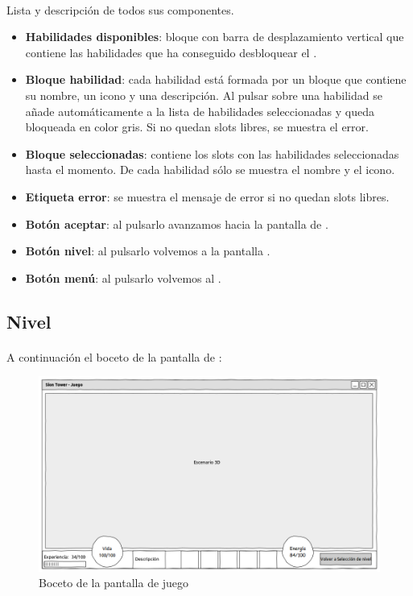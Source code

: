 \paragraph{}
Lista y descripción de todos sus componentes.

\begin{itemize}
    \item \textbf{Habilidades disponibles}: bloque con barra de desplazamiento
    vertical que contiene las habilidades que ha conseguido desbloquear el
    \jugador.
    \item \textbf{Bloque habilidad}: cada habilidad está formada por un bloque
    que contiene su nombre, un icono y una descripción. Al pulsar sobre una habilidad
    se añade automáticamente a la lista de habilidades seleccionadas y queda
    bloqueada en color gris. Si no quedan slots libres, se muestra el error.
    \item \textbf{Bloque seleccionadas}: contiene los slots con las habilidades
    seleccionadas hasta el momento. De cada habilidad sólo se muestra el nombre
    y el icono.
    \item \textbf{Etiqueta error}: se muestra el mensaje de error si no quedan
    slots libres.
    \item \textbf{Botón aceptar}: al pulsarlo avanzamos hacia la pantalla de \nivel.
    \item \textbf{Botón nivel}: al pulsarlo volvemos a la pantalla \selnivel.
    \item \textbf{Botón menú}: al pulsarlo volvemos al \menu.
\end{itemize}

\clearpage

\subsection{Nivel}
\label{sec:ui-nivel}

\paragraph{}
A continuación el boceto de la pantalla de \nivel:

\begin{figure}[H]
    \centering
        \includegraphics[width=\textwidth]{img/juego.png} 
    \caption{Boceto de la pantalla de juego}
    \label{img:juego}
\end{figure}

